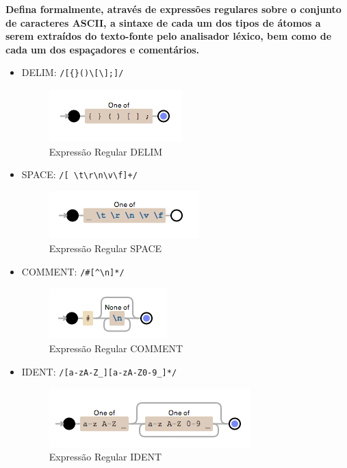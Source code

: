 
\textbf{Defina formalmente, através de expressões regulares sobre o conjunto de caracteres ASCII, a sintaxe de cada um dos tipos de átomos a serem extraídos do texto-fonte pelo analisador léxico, bem como de cada um dos espaçadores e comentários.}

\begin{itemize}

	\item DELIM: \verb!/[{}()\[\];]/!
	
	\begin{figure}[H]
		\centering 
		\includegraphics{images/REGEX/1-DELIM.png}  
		\caption{Expressão Regular DELIM}
	\end{figure}
	
	\item SPACE: \verb!/[ \t\r\n\v\f]+/!
	
	\begin{figure}[H]
		\centering 
		\includegraphics{images/REGEX/2-SPACE.png}  
		\caption{Expressão Regular SPACE}
	\end{figure}
	
	\item COMMENT: \verb!/#[^\n]*/!
	
	\begin{figure}[H]
		\centering 
		\includegraphics{images/REGEX/3-COMMENT.png}  
		\caption{Expressão Regular COMMENT}
	\end{figure}
	
	\item IDENT: \verb!/[a-zA-Z_][a-zA-Z0-9_]*/!
	
	\begin{figure}[H]
		\centering 
		\includegraphics{images/REGEX/4-IDENT.png}  
		\caption{Expressão Regular IDENT}
	\end{figure}
	

\end{itemize}
